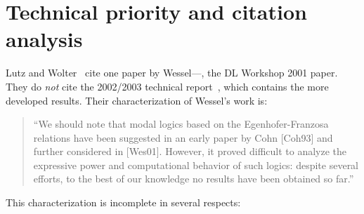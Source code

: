 \documentclass[11pt]{article}
\begin{document}
\section{Technical priority and citation analysis}
\label{sec:priority}

Lutz and Wolter~\cite{LutzWolter2006} cite one paper by
Wessel---\cite{Wessel2001}, the DL Workshop 2001 paper.  They do \emph{not}
cite the 2002/2003 technical report~\cite{Wessel2003}, which contains the
more developed results.  Their characterization of Wessel's work is:

\begin{quote}
  ``We should note that modal logics based on the Egenhofer-Franzosa
  relations have been suggested in an early paper by Cohn [Coh93] and
  further considered in [Wes01].  However, it proved difficult to analyze
  the expressive power and computational behavior of such logics: despite
  several efforts, to the best of our knowledge no results have been
  obtained so far.''~\cite{LutzWolter2006}
\end{quote}

This characterization is incomplete in several respects:
\end{document}
